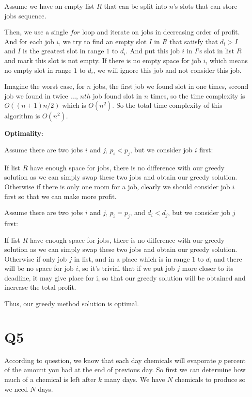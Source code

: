 \documentclass[a4paper]{article}
\begin{document}
	Assume we have an empty list $R$ that can be split into $n$'s slots that can store jobs sequence.
	
	Then, we use a single $for$ loop and iterate on jobs in decreasing order of profit. And for each job $i$, we try to find an empty slot $I$ in $R$ that satisfy that $d_i > I$ and $I$ is the greatest slot in range $1$ to $d_i$. And put this job $i$ in $I$'s slot in list $R$ and mark this slot is not empty. If there is no empty space for job $i$, which means no empty slot in range $1$ to $d_i$, we will ignore this job and not consider this job.
	
	Imagine the worst case, for $n$ jobs, the first job we found slot in one times, second job we found in twice ..., $nth$ job found slot in $n$ times, so the time complexity is $O((n+1)n/2)$ which is $O(n^2)$. So the total time complexity of this algorithm is $O(n^2)$.
	
	\textbf{Optimality}: 
	
	Assume there are two jobs $i$ and $j$, $p_i < p_j$, but we consider job $i$ first:
	
	If list $R$ have enough space for jobs, there is no difference with our greedy solution as we can simply swap these two jobs and obtain our greedy solution. Otherwise if there is only one room for a job, clearly we should consider job $i$ first so that we can make more profit.
	
	Assume there are two jobs $i$ and $j$, $p_i = p_j$, and $d_i < d_j$, but we consider job $j$ first:
	
	If list $R$ have enough space for jobs, there is no difference with our greedy solution as we can simply swap these two jobs and obtain our greedy solution. Otherwise if only job $j$ in list, and in a place which is in range $1$ to $d_i$ and there will be no space for job $i$, so it's trivial that if we put job $j$ more closer to its deadline, it may give place for i, so that our greedy solution will be obtained and increase the total profit.
	
	Thus, our greedy method solution is optimal.

	\section*{Q5}
	According to question, we know that each day chemicals will evaporate $p$ percent of the amount you had at the end of previous day. So first we can determine how much of a chemical is left after $k$ many days. We have $N$ chemicals to produce so we need $N$ days.
	
\end{document}
